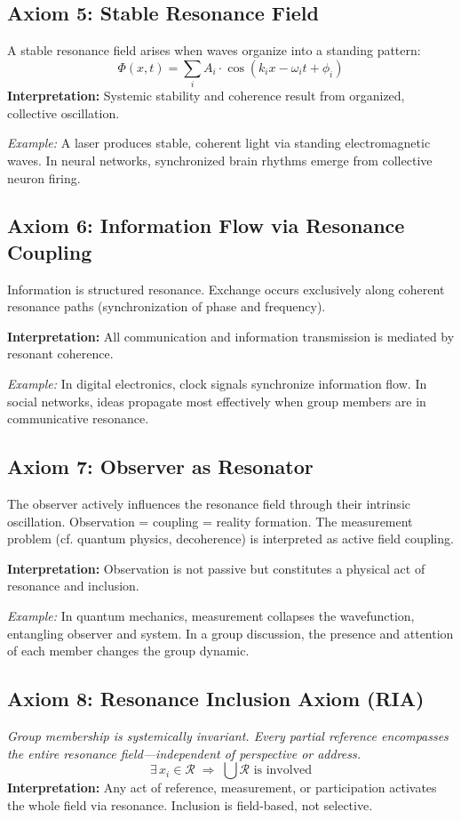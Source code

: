 \documentclass[12pt]{article}
\begin{document}
	\subsection{Axiom 5: Stable Resonance Field}
	A stable resonance field arises when waves organize into a standing pattern:
	\[
	\Phi(x, t) = \sum_{i} A_i \cdot \cos(k_i x - \omega_i t + \phi_i)
	\]
	\textbf{Interpretation:} Systemic stability and coherence result from organized, collective oscillation.
	
	\textit{Example:} A laser produces stable, coherent light via standing electromagnetic waves. In neural networks, synchronized brain rhythms emerge from collective neuron firing.
	
	\subsection{Axiom 6: Information Flow via Resonance Coupling}
	Information is structured resonance. Exchange occurs exclusively along coherent resonance paths (synchronization of phase and frequency).
	
	\textbf{Interpretation:} All communication and information transmission is mediated by resonant coherence.
	
	\textit{Example:} In digital electronics, clock signals synchronize information flow. In social networks, ideas propagate most effectively when group members are in communicative resonance.
	
	\subsection{Axiom 7: Observer as Resonator}
	The observer actively influences the resonance field through their intrinsic oscillation. Observation = coupling = reality formation. The measurement problem (cf. quantum physics, decoherence) is interpreted as active field coupling.
	
	\textbf{Interpretation:} Observation is not passive but constitutes a physical act of resonance and inclusion.
	
	\textit{Example:} In quantum mechanics, measurement collapses the wavefunction, entangling observer and system. In a group discussion, the presence and attention of each member changes the group dynamic.
	
	\subsection{Axiom 8: Resonance Inclusion Axiom (RIA)}
	\textit{Group membership is systemically invariant. Every partial reference encompasses the entire resonance field—independent of perspective or address.}
	\[
	\exists\, x_i \in \mathcal{R} \;\Rightarrow\; \bigcup \mathcal{R} \text{ is involved}
	\]
	\textbf{Interpretation:} Any act of reference, measurement, or participation activates the whole field via resonance. Inclusion is field-based, not selective.
	
\end{document}
